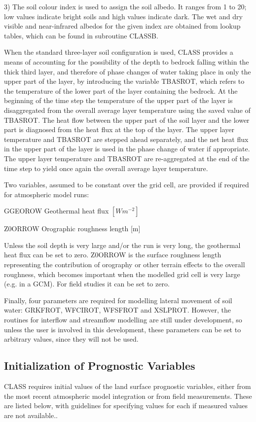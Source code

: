 3) The soil colour index is used to assign the soil albedo. It ranges from 1 to 20; low values indicate bright soils and high values indicate dark. The wet and dry visible and near-\/infrared albedos for the given index are obtained from lookup tables, which can be found in subroutine C\+L\+A\+S\+S\+B.

When the standard three-\/layer soil configuration is used, C\+L\+A\+S\+S provides a means of accounting for the possibility of the depth to bedrock falling within the thick third layer, and therefore of phase changes of water taking place in only the upper part of the layer, by introducing the variable T\+B\+A\+S\+R\+O\+T, which refers to the temperature of the lower part of the layer containing the bedrock. At the beginning of the time step the temperature of the upper part of the layer is disaggregated from the overall average layer temperature using the saved value of T\+B\+A\+S\+R\+O\+T. The heat flow between the upper part of the soil layer and the lower part is diagnosed from the heat flux at the top of the layer. The upper layer temperature and T\+B\+A\+S\+R\+O\+T are stepped ahead separately, and the net heat flux in the upper part of the layer is used in the phase change of water if appropriate. The upper layer temperature and T\+B\+A\+S\+R\+O\+T are re-\/aggregated at the end of the time step to yield once again the overall average layer temperature.

Two variables, assumed to be constant over the grid cell, are provided if required for atmospheric model runs\+:


\begin{DoxyItemize}
\item G\+G\+E\+O\+R\+O\+W Geothermal heat flux $[W m^{-2} ]$
\item Z0\+O\+R\+R\+O\+W Orographic roughness length \mbox{[}m\mbox{]}
\end{DoxyItemize}

Unless the soil depth is very large and/or the run is very long, the geothermal heat flux can be set to zero. Z0\+O\+R\+R\+O\+W is the surface roughness length representing the contribution of orography or other terrain effects to the overall roughness, which becomes important when the modelled grid cell is very large (e.\+g. in a G\+C\+M). For field studies it can be set to zero.

Finally, four parameters are required for modelling lateral movement of soil water\+: G\+R\+K\+F\+R\+O\+T, W\+F\+C\+I\+R\+O\+T, W\+F\+S\+F\+R\+O\+T and X\+S\+L\+P\+R\+O\+T. However, the routines for interflow and streamflow modelling are still under development, so unless the user is involved in this development, these parameters can be set to arbitrary values, since they will not be used.\hypertarget{index_initProgVar}{}\subsection{Initialization of Prognostic Variables}\label{index_initProgVar}
C\+L\+A\+S\+S requires initial values of the land surface prognostic variables, either from the most recent atmospheric model integration or from field measurements. These are listed below, with guidelines for specifying values for each if measured values are not available..


